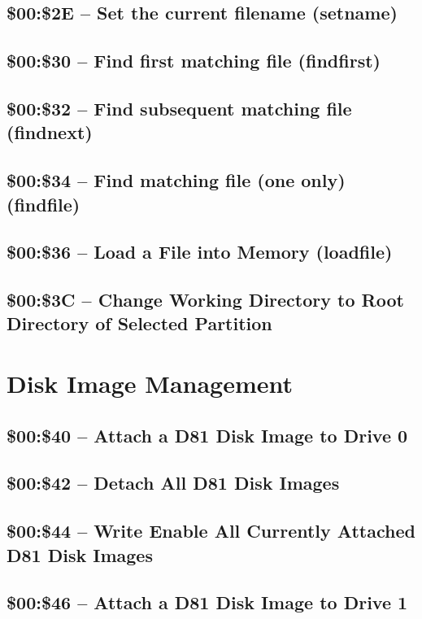 \subsection{\$00:\$2E -- Set the current filename (setname)}

\subsection{\$00:\$30 -- Find first matching file (findfirst)}
\subsection{\$00:\$32 -- Find subsequent matching file (findnext)}
\subsection{\$00:\$34 -- Find matching file (one only) (findfile)}
\subsection{\$00:\$36 -- Load a File into Memory (loadfile)}
\subsection{\$00:\$3C -- Change Working Directory to Root Directory of Selected Partition}

\section{Disk Image Management}

\subsection{\$00:\$40 -- Attach a D81 Disk Image to Drive 0}
\subsection{\$00:\$42 -- Detach All D81 Disk Images}
\subsection{\$00:\$44 -- Write Enable All Currently Attached D81 Disk Images}
\subsection{\$00:\$46 -- Attach a D81 Disk Image to Drive 1}

